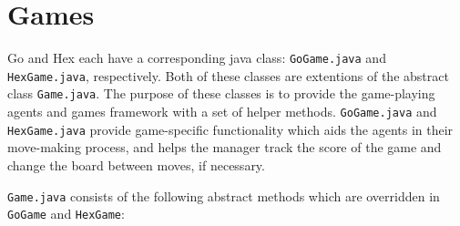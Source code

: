 \section{Games}
Go and Hex each have a corresponding java class: \texttt{GoGame.java} and \texttt{HexGame.java}, respectively.  Both of these classes are extentions of the abstract class \texttt{Game.java}.  The purpose of these classes is to provide the game-playing agents and games framework with a set of helper methods. \texttt{GoGame.java} and \texttt{HexGame.java} provide game-specific functionality which aids the agents in their move-making process, and helps the manager track the score of the game and change the board between moves, if necessary.

\texttt{Game.java} consists of the following abstract methods which are overridden in \texttt{GoGame} and \texttt{HexGame}:
